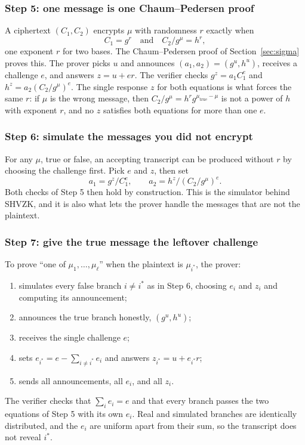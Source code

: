 \documentclass[11pt,a4paper]{article}
\theoremstyle{remark}
\begin{document}
\subsubsection*{Step 5: one message is one Chaum--Pedersen proof}
A ciphertext $(C_1, C_2)$ encrypts $\mu$ with randomness $r$ exactly when
\[
  C_1 = g^{r} \quad\text{and}\quad C_2 / g^{\mu} = h^{r},
\]
one exponent $r$ for two bases. The Chaum--Pedersen proof of
Section~\ref{sec:sigma} proves this. The prover picks $u$ and announces $(a_1,
a_2) = (g^{u}, h^{u})$, receives a challenge $e$, and answers $z = u + e
r$. The verifier checks $g^{z} = a_1 C_1^{e}$ and $h^{z} = a_2 (C_2 /
g^{\mu})^{e}$. The single response $z$ for both equations is what forces
the same $r$: if $\mu$ is the wrong message, then $C_2 / g^{\mu} = h^{r}
g^{\mu_{\mathrm{true}} - \mu}$ is not a power of $h$ with exponent $r$,
and no $z$ satisfies both equations for more than one $e$.

\subsubsection*{Step 6: simulate the messages you did not encrypt}
For any $\mu$, true or false, an accepting transcript can be produced
without $r$ by choosing the challenge first. Pick $e$ and $z$, then set
\[
  a_1 = g^{z} / C_1^{e}, \qquad a_2 = h^{z} / (C_2 / g^{\mu})^{e}.
\]
Both checks of Step 5 then hold by construction. This is the simulator
behind SHVZK, and it is also what lets the prover handle the messages that
are not the plaintext.

\subsubsection*{Step 7: give the true message the leftover challenge}
To prove ``one of $\mu_1, \ldots, \mu_\ell$'' when the plaintext is
$\mu_{i^*}$, the prover:
\begin{enumerate}[nosep]
  \item simulates every false branch $i \ne i^*$ as in Step 6, choosing
  $e_i$ and $z_i$ and computing its announcement;
  \item announces the true branch honestly, $(g^{u}, h^{u})$;
  \item receives the single challenge $e$;
  \item sets $e_{i^*} = e - \sum_{i \ne i^*} e_i$ and answers $z_{i^*} = u
  + e_{i^*} r$;
  \item sends all announcements, all $e_i$, and all $z_i$.
\end{enumerate}
The verifier checks that $\sum_i e_i = e$ and that every branch passes the
two equations of Step 5 with its own $e_i$. Real and simulated branches
are identically distributed, and the $e_i$ are uniform apart from their
sum, so the transcript does not reveal $i^*$.
\end{document}
